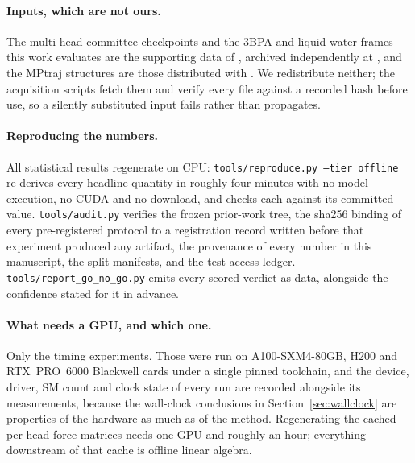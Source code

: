 \paragraph{Inputs, which are not ours.}
The multi-head committee checkpoints and the 3BPA and liquid-water frames this
work evaluates are the supporting data of \citet{beck2025committee}, archived
independently at \texttt{\fsUpstreamZenodo}, and the MPtraj structures are those
distributed with \citet{deng2023chgnet}. We redistribute neither; the acquisition
scripts fetch them and verify every file against a recorded hash before use, so a
silently substituted input fails rather than propagates.

\paragraph{Reproducing the numbers.}
All statistical results regenerate on CPU:
\texttt{tools/reproduce.py --tier offline} re-derives every headline quantity in
roughly four minutes with no model execution, no CUDA and no download, and checks
each against its committed value. \texttt{tools/audit.py} verifies the frozen
prior-work tree, the sha256 binding of every pre-registered protocol to a
registration record written before that experiment produced any artifact, the
provenance of every number in this manuscript, the split manifests, and the
test-access ledger. \texttt{tools/report\_go\_no\_go.py} emits every scored
verdict as data, alongside the confidence stated for it in advance.

\paragraph{What needs a GPU, and which one.}
Only the timing experiments. Those were run on A100-SXM4-80GB, H200 and
RTX~PRO~6000 Blackwell cards under a single pinned toolchain, and the device,
driver, SM count and clock state of every run are recorded alongside its
measurements, because the wall-clock conclusions in Section~\ref{sec:wallclock}
are properties of the hardware as much as of the method. Regenerating the cached
per-head force matrices needs one GPU and roughly an hour; everything downstream
of that cache is offline linear algebra.

%
